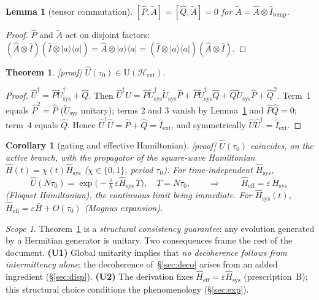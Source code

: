 \documentclass[11pt,a4paper]{article}
\newcommand{\ket}[1]{\lvert #1\rangle}
\newcommand{\bra}[1]{\langle #1\rvert}
\newcommand{\Hext}{\mathcal{H}_{\mathrm{ext}}}
\newcommand{\Hsysop}{\hat{H}_{\mathrm{sys}}}
\newcommand{\Heff}{\hat{H}_{\mathrm{eff}}}
\newcommand{\Iext}{\hat{I}_{\mathrm{ext}}}
\newcommand{\statut}[1]{{\footnotesize\textsf{[#1]}}}
\theoremstyle{plain}
\newtheorem{theorem}{Theorem}
\newtheorem{lemma}{Lemma}
\newtheorem{corollary}{Corollary}
\theoremstyle{definition}
\theoremstyle{remark}
\newtheorem*{scope}{Scope}
\begin{document}
\begin{lemma}[tensor commutation]\label{lem:comm}
$[\hat{P},\tilde{A}]=[\hat{Q},\tilde{A}]=0$ for $\tilde{A}=\hat{A}\otimes\hat{I}_{\mathrm{temp}}$.
\end{lemma}
\begin{proof}
$\hat{P}$ and $\tilde A$ act on disjoint factors:
$(\hat A\otimes\hat I)(\hat I\otimes\ket{a}\bra{a})=\hat A\otimes\ket{a}\bra{a}
=(\hat I\otimes\ket{a}\bra{a})(\hat A\otimes\hat I)$.
\end{proof}

\begin{theorem}\label{thm:unit}\statut{proof}
$\hat{U}(\tau_0)\in\mathrm{U}(\Hext)$.
\end{theorem}
\begin{proof}
$\hat{U}^\dagger=\hat{P}\tilde{U}_{\mathrm{sys}}^\dagger+\hat{Q}$. Then
$\hat{U}^\dagger\hat{U}
=\hat{P}\tilde{U}_{\mathrm{sys}}^\dagger\tilde{U}_{\mathrm{sys}}\hat{P}
+\hat{P}\tilde{U}_{\mathrm{sys}}^\dagger\hat{Q}
+\hat{Q}\tilde{U}_{\mathrm{sys}}\hat{P}+\hat{Q}^2$.
Term~1 equals $\hat P^2=\hat P$ ($\tilde U_{\mathrm{sys}}$ unitary); terms 2 and 3
vanish by Lemma~\ref{lem:comm} and $\hat P\hat Q=0$; term~4 equals $\hat Q$. Hence
$\hat U^\dagger\hat U=\hat P+\hat Q=\Iext$, and symmetrically
$\hat U\hat U^\dagger=\Iext$.
\end{proof}

\begin{corollary}[gating and effective Hamiltonian]\label{cor:floquet}\statut{proof}
$\hat U(\tau_0)$ coincides, on the active branch, with the propagator of the
square-wave Hamiltonian $\hat H(t)=\chi(t)\Hsysop$ ($\chi\in\{0,1\}$, period
$\tau_0$). For time-independent $\Hsysop$,
\[
\hat U(N\tau_0)=\exp\!\big(-\tfrac{i}{\hbar}\,\varepsilon\Hsysop\,T\big),
\quad T=N\tau_0,
\qquad\Longrightarrow\qquad
\boxed{\;\Heff=\varepsilon\,\Hsysop\;}
\]
(Floquet Hamiltonian), the continuous limit being immediate. For $\Hsysop(t)$,
$\Heff=\varepsilon\bar{H}+O(\tau_0)$ (Magnus expansion).
\end{corollary}

\begin{scope}
Theorem~\ref{thm:unit} is a \emph{structural consistency guarantee}: any
evolution generated by a Hermitian generator is unitary. Two consequences frame
the rest of the document.
\textbf{(U1)} Global unitarity implies that \emph{no decoherence follows from
intermittency alone}; the decoherence of~\S\ref{sec:deco} arises from an added
ingredient (\S\ref{sec:disp}). \textbf{(U2)} The derivation fixes
$\Heff=\varepsilon\Hsysop$ (prescription~B); this structural choice conditions the
phenomenology (\S\ref{sec:exp}).
\end{scope}
\end{document}
